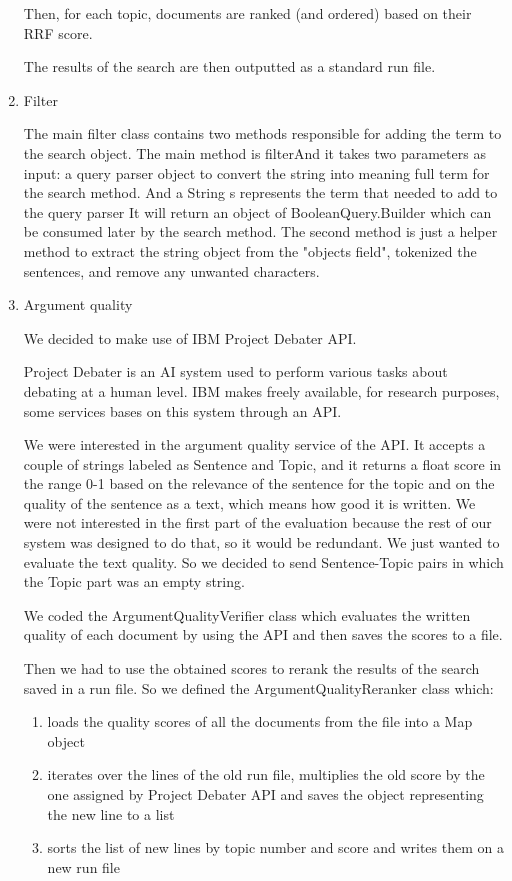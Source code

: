 \begin{enumerate}
        Then, for each topic, documents are ranked (and ordered) based on their RRF score.
        
        The results of the search are then outputted as a standard run file.
  \item Filter
 
    The main filter class contains two methods responsible for adding the term to the search object. The main method is filterAnd it takes two parameters as input: a query parser object to convert the string into meaning full term for the search method. And a String s represents the term that needed to add to the query parser It will return an object of BooleanQuery.Builder which can be consumed later by the search method. The second method is just a helper method to extract the string object from the "objects field", tokenized the sentences, and remove any unwanted characters.

  \item Argument quality
  
  We decided to make use of IBM Project Debater API.
  
      Project Debater is an AI system used to perform various tasks about debating at a human level. IBM makes freely available, for research purposes, some services bases on this system through an API. \citep{ProjectDebaterAPI}
      
      We were interested in the argument quality service of the API. It accepts a couple of strings labeled as Sentence and Topic, and it returns a float score in the range 0-1 based on the relevance of the sentence for the topic and on the quality of the sentence as a text, which means how good it is written. We were not interested in the first part of the evaluation because the rest of our system was designed to do that, so it would be redundant. We just wanted to evaluate the text quality. So we decided to send Sentence-Topic pairs in which the Topic part was an empty string.
      
      We coded the ArgumentQualityVerifier class which evaluates the written quality of each document by using the API and then saves the scores to a file.
      
      Then we had to use the obtained scores to rerank the results of the search saved in a run file. So we defined the ArgumentQualityReranker class which:
      
       \begin{enumerate} 
           \item loads the quality scores of all the documents from the file into a Map object \item iterates over the lines of the old run file, multiplies the old score by the one assigned by Project Debater API and saves the object representing the new line to a list \item sorts the list of new lines by topic number and score and writes them on a new run file 
       \end{enumerate}
\end{enumerate}

